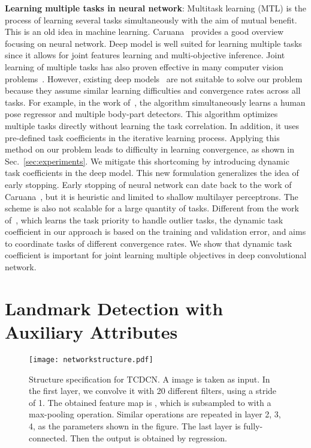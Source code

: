 \documentclass[10pt,journal,compsoc]{IEEEtran}
\begin{document}
\noindent \textbf{Learning multiple tasks in neural network}:
Multitask learning (MTL) is the process of learning several tasks simultaneously with the aim of mutual benefit. This is an old idea in machine learning. Caruana~\cite{caruana1997multitask} provides a good overview focusing on neural network.
Deep model is well suited for learning multiple tasks since it allows for joint features learning and multi-objective inference. Joint learning of multiple tasks has also proven effective in many computer vision problems~\cite{ahmed2008training,weston2012deep,ABC}. However, existing deep models~\cite{collobert2008unified,ahmed2008training} are not suitable to solve our problem because they assume similar learning difficulties and convergence rates across all tasks. For example, in the work of~\cite{ABC}, the algorithm simultaneously learns a human pose regressor and multiple body-part detectors. This algorithm optimizes multiple tasks directly without learning the task correlation. In addition, it uses pre-defined task coefficients in the iterative learning process. Applying this method on our problem leads to difficulty in learning convergence, as shown in Sec.~\ref{sec:experiments}. We mitigate this shortcoming by introducing dynamic task coefficients in the deep model. This new formulation generalizes the idea of early stopping. Early stopping of neural network can date back to the work of Caruana~\cite{caruana1997multitask}, but it is heuristic and  limited to shallow multilayer perceptrons. The scheme is also not scalable for a large quantity of tasks. Different from the work of~\cite{6753948}, which learns the task priority to handle outlier tasks, the dynamic task coefficient in our approach is based on the training and validation error, and aims to coordinate tasks of different convergence rates. We show that dynamic task coefficient is important for joint learning multiple objectives in deep convolutional network.





\section{Landmark Detection with Auxiliary Attributes}
\label{sec: TC-CNN1}
\begin{figure*}
  \centering
  \texttt{[image: networkstructure.pdf]}\\
  \caption{Structure specification for TCDCN. A  image is taken as input. In the first layer, we convolve it with 20 different  filters, using a stride of 1. The obtained feature map is , which is subsampled to  with a  max-pooling operation. Similar operations are repeated in layer 2, 3, 4, as the parameters shown in the figure. The last layer is fully-connected. Then the output is obtained by regression.}

  \label{fig:networkstructure}
\end{figure*}
\end{document}

